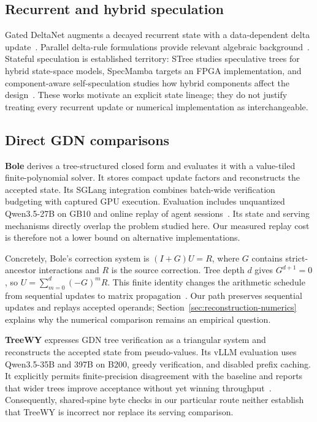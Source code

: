 \documentclass[conference]{IEEEtran}
\begin{document}
\subsection{Recurrent and hybrid speculation}
Gated DeltaNet augments a decayed recurrent state with a data-dependent delta update~\cite{yang2024gated}. Parallel delta-rule formulations provide relevant algebraic background~\cite{yang2024delta}. Stateful speculation is established territory: STree studies speculative trees for hybrid state-space models, SpecMamba targets an FPGA implementation, and component-aware self-speculation studies how hybrid components affect the design~\cite{wu2025stree,zhong2025specmamba,borobia2026component}. These works motivate an explicit state lineage; they do not justify treating every recurrent update or numerical implementation as interchangeable.

\subsection{Direct GDN comparisons}
\textbf{Bole} derives a tree-structured closed form and evaluates it with a value-tiled finite-polynomial solver. It stores compact update factors and reconstructs the accepted state. Its SGLang integration combines batch-wide verification budgeting with captured GPU execution. Evaluation includes unquantized Qwen3.5-27B on GB10 and online replay of agent sessions~\cite{wang2026bole}. Its state and serving mechanisms directly overlap the problem studied here. Our measured replay cost is therefore not a lower bound on alternative implementations.

Concretely, Bole's correction system is $(I+G)U=R$, where $G$ contains strict-ancestor interactions and $R$ is the source correction. Tree depth $d$ gives $G^{d+1}=0$, so $U=\sum_{m=0}^{d}(-G)^mR$. This finite identity changes the arithmetic schedule from sequential updates to matrix propagation~\cite{wang2026bole}. Our path preserves sequential updates and replays accepted operands; Section~\ref{sec:reconstruction-numerics} explains why the numerical comparison remains an empirical question.

\textbf{TreeWY} expresses GDN tree verification as a triangular system and reconstructs the accepted state from pseudo-values. Its vLLM evaluation uses Qwen3.5-35B and 397B on B200, greedy verification, and disabled prefix caching. It explicitly permits finite-precision disagreement with the baseline and reports that wider trees improve acceptance without yet winning throughput~\cite{ghantasala2026treewy}. Consequently, shared-spine byte checks in our particular route neither establish that TreeWY is incorrect nor replace its serving comparison.
\end{document}
